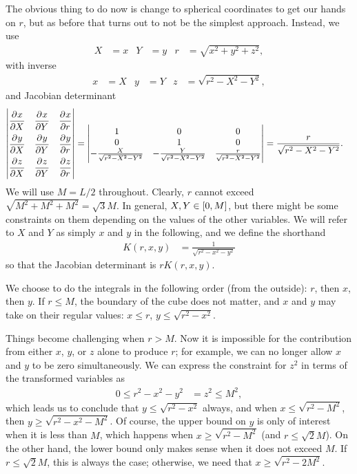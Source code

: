 The obvious thing to do now is change to spherical coordinates to get our hands on $r$, but as before that turns out to not be the simplest approach.
Instead, we use
\begin{align}
	X
	&= x
	&
	Y
	&= y
	&
	r
	&= \sqrt{x^2 + y^2 + z^2},
\end{align}
with inverse
\begin{align}
	x
	&= X
	&
	y
	&= Y
	&
	z
	&= \sqrt{r^2 - X^2 - Y^2},
\end{align}
and Jacobian determinant
\begin{align}
	\begin{vmatrix}
			\dpd{x}{X} & \dpd{x}{Y} & \dpd{x}{r} \\[3 mm]
			\dpd{y}{X} & \dpd{y}{Y} & \dpd{y}{r} \\[3 mm]
			\dpd{z}{X} & \dpd{z}{Y} & \dpd{z}{r}
		\end{vmatrix}
	&= \begin{vmatrix}
			1 & 0 & 0 \\
			0 & 1 & 0 \\
			-\frac{X}{\sqrt{r^2 - X^2 - Y^2}} & -\frac{Y}{\sqrt{r^2 - X^2 - Y^2}} & \frac{r}{\sqrt{r^2 - X^2 - Y^2}}
		\end{vmatrix}
	= \frac{r}{\sqrt{r^2 - X^2 - Y^2}}.
\end{align}
We will use $M = L / 2$ throughout.
Clearly, $r$ cannot exceed $\sqrt{M^2 + M^2 + M^2} = \sqrt{3} M$.
In general, $X, Y \in \intcc{0, M}$, but there might be some constraints on them depending on the values of the other variables.
We will refer to $X$ and $Y$ as simply $x$ and $y$ in the following, and we define the shorthand
\begin{align}
	K(r, x, y)
	&= \frac{1}{\sqrt{r^2 - x^2 - y^2}}
\end{align}
so that the Jacobian determinant is $r K(r, x, y)$.

We choose to do the integrals in the following order (from the outside): $r$, then $x$, then $y$.
If $r \le M$, the boundary of the cube does not matter, and $x$ and $y$ may take on their regular values: $x \le r$, $y \le \sqrt{r^2 - x^2}$.

Things become challenging when $r > M$.
Now it is impossible for the contribution from either $x$, $y$, or $z$ alone to produce $r$; for example, we can no longer allow $x$ and $y$ to be zero simultaneously.
We can express the constraint for $z^2$ in terms of the transformed variables as
\begin{align}
	0
	\le r^2 - x^2 - y^2
	&= z^2
	\le M^2,
\end{align}
which leads us to conclude that $y \le \sqrt{r^2 - x^2}$ always, and when $x \le \sqrt{r^2 - M^2}$, then $y \ge \sqrt{r^2 - x^2 - M^2}$.
Of course, the upper bound on $y$ is only of interest when it is less than $M$, which happens when $x \ge \sqrt{r^2 - M^2}$ (and $r \le \sqrt{2} M$).
On the other hand, the lower bound only makes sense when it does not exceed $M$.
If $r \le \sqrt{2} M$, this is always the case; otherwise, we need that $x \ge \sqrt{r^2 - 2 M^2}$.

